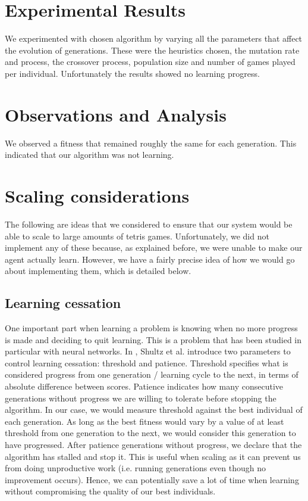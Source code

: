 \documentclass[10pt,a4paper]{report}
\begin{document}
\section{Experimental Results}
We experimented with chosen algorithm by varying all the parameters that affect the evolution of generations. These were the heuristics chosen, the mutation rate and process, the crossover process, population size and number of games played per individual. Unfortunately the results showed no learning progress.

\section{Observations and Analysis}
We observed a fitness that remained roughly the same for each generation. This indicated that our algorithm was not learning.

\section{Scaling considerations}
The following are ideas that we considered to ensure that our system would be able to scale to large amounts of tetris games. Unfortunately, we did not implement any of these because, as explained before, we were unable to make our agent actually learn. However, we have a fairly precise idea of how we would go about implementing them, which is detailed below.

\subsection{Learning cessation}
One important part when learning a problem is knowing when no more progress is made and deciding to quit learning. This is a problem that has been studied in particular with neural networks. In \cite{shultz2012knowing}, Shultz et al. introduce two parameters to control learning cessation: threshold and patience. Threshold specifies what is considered progress from one generation / learning cycle to the next, in terms of absolute difference between scores. Patience indicates how many consecutive generations without progress we are willing to tolerate before stopping the algorithm. In our case, we would measure threshold against the best individual of each generation. As long as the best fitness would vary by a value of at least threshold from one generation to the next, we would consider this generation to have progressed. After patience generations without progress, we declare that the algorithm has stalled and stop it. This is useful when scaling as it can prevent us from doing unproductive work (i.e. running generations even though no improvement occurs). Hence, we can potentially save a lot of time when learning without compromising the quality of our best individuals.
\end{document}

